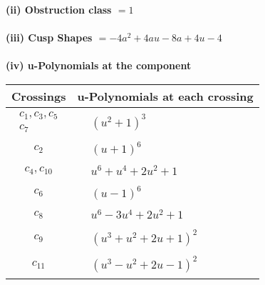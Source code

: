 \documentclass[1p]{elsarticle_modified}
\theoremstyle{definition}
\begin{document}
\flushleft \textbf{(ii) Obstruction class $= 1$}\\~\\
\flushleft \textbf{(iii) Cusp Shapes $= -4 a^2+4 a u-8 a+4 u-4$}\\~\\
\newpage\renewcommand{\arraystretch}{1}
\flushleft \textbf{(iv) u-Polynomials at the component}\newline \\
\begin{tabular}{m{50pt}|m{274pt}}
Crossings & \hspace{64pt}u-Polynomials at each crossing \\
\hline $$\begin{aligned}c_{1},c_{3},c_{5}\\c_{7}\end{aligned}$$&$\begin{aligned}
&(u^2+1)^3
\end{aligned}$\\
\hline $$\begin{aligned}c_{2}\end{aligned}$$&$\begin{aligned}
&(u+1)^6
\end{aligned}$\\
\hline $$\begin{aligned}c_{4},c_{10}\end{aligned}$$&$\begin{aligned}
&u^6+u^4+2 u^2+1
\end{aligned}$\\
\hline $$\begin{aligned}c_{6}\end{aligned}$$&$\begin{aligned}
&(u-1)^6
\end{aligned}$\\
\hline $$\begin{aligned}c_{8}\end{aligned}$$&$\begin{aligned}
&u^6-3 u^4+2 u^2+1
\end{aligned}$\\
\hline $$\begin{aligned}c_{9}\end{aligned}$$&$\begin{aligned}
&(u^3+u^2+2 u+1)^2
\end{aligned}$\\
\hline $$\begin{aligned}c_{11}\end{aligned}$$&$\begin{aligned}
&(u^3- u^2+2 u-1)^2
\end{aligned}$\\
\hline
\end{tabular}\\~\\
\end{document}
